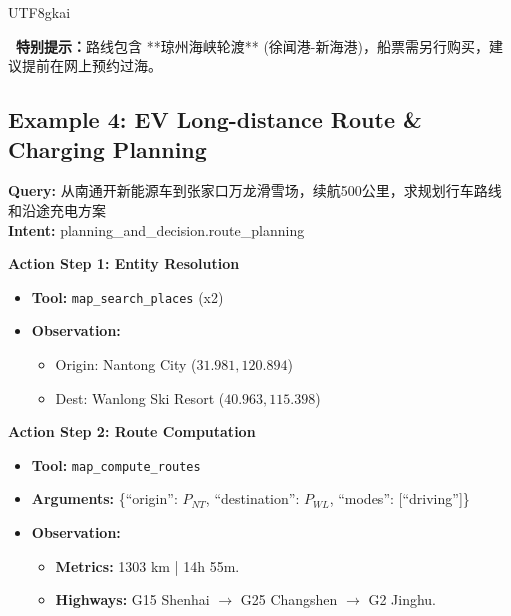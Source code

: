 \begin{CJK*}{UTF8}{gkai}
\begin{tcolorbox}[
    breakable,
    enhanced,
    colframe=color_amapblue,
    colback=mycolor,
    coltitle=white,
    title = {\textbf{Case Study: Cross-province Self-driving Guide}},
    fonttitle=\bfseries
]
\begin{tcolorbox}[colback=white, colframe=color_amapblue!30!white, arc=4pt, boxrule=1pt, left=4pt, right=4pt, top=4pt, bottom=4pt]
    \colorbox{color_amapgrey}{\parbox{\dimexpr\linewidth-6pt}{
        \scriptsize 
        \textbf{\faShip\ 特别提示：}路线包含 **琼州海峡轮渡** (徐闻港-新海港)，船票需另行购买，建议提前在网上预约过海。
    }}
\end{tcolorbox}

\end{tcolorbox}



\subsection{Example 4: EV Long-distance Route \& Charging Planning}
\begin{tcolorbox}[
    breakable,
    enhanced,
    colframe=color_amapblue,
    colback=mycolor,
    coltitle=white,
    title = {\textbf{Case Study: EV Inter-provincial Travel Guide}},
    fonttitle=\bfseries
]

\textbf{Query:} 从南通开新能源车到张家口万龙滑雪场，续航500公里，求规划行车路线和沿途充电方案\\
\textbf{Intent:} planning\_and\_decision.route\_planning
\tcblower

\textbf{Action Step 1: Entity Resolution}
\begin{itemize}[leftmargin=12pt, itemsep=0pt]
  \item \textbf{Tool:} \texttt{map\_search\_places} (x2)
  \item \textbf{Observation:} 
    \begin{itemize}[leftmargin=10pt, itemsep=0pt]
        \item Origin: Nantong City ($31.981, 120.894$)
        \item Dest: Wanlong Ski Resort ($40.963, 115.398$)
    \end{itemize}
\end{itemize}

\textbf{Action Step 2: Route Computation}
\begin{itemize}[leftmargin=12pt, itemsep=0pt]
  \item \textbf{Tool:} \texttt{map\_compute\_routes}
  \item \textbf{Arguments:} \{``origin'': $P_{NT}$, ``destination'': $P_{WL}$, ``modes'': [``driving'']\}
  \item \textbf{Observation:} 
    \begin{itemize}[leftmargin=10pt]
        \item \textbf{Metrics:} 1303 km | 14h 55m.
        \item \textbf{Highways:} G15 Shenhai $\rightarrow$ G25 Changshen $\rightarrow$ G2 Jinghu.
    \end{itemize}
\end{itemize}


\end{tcolorbox}
\end{CJK*}
